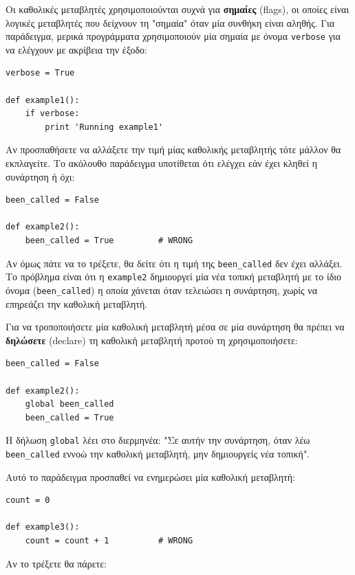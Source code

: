 \documentclass[10pt]{book}
\begin{document}
Οι καθολικές μεταβλητές χρησιμοποιούνται συχνά για {\bf σημαίες} (flags), οι οποίες είναι λογικές μεταβλητές που δείχνουν τη "σημαία" όταν μία συνθήκη είναι αληθής. Για παράδειγμα, μερικά προγράμματα χρησιμοποιούν μία σημαία με όνομα  {\tt verbose} για να ελέγχουν με ακρίβεια την έξοδο:

\begin{verbatim}
verbose = True

def example1():
    if verbose:
        print 'Running example1'
\end{verbatim}
%
Αν προσπαθήσετε να αλλάξετε την τιμή μίας καθολικής μεταβλητής τότε μάλλον θα εκπλαγείτε. Το ακόλουθο παράδειγμα υποτίθεται ότι ελέγχει εάν έχει κληθεί η συνάρτηση ή όχι:

\begin{verbatim}
been_called = False

def example2():
    been_called = True         # WRONG
\end{verbatim}
%
Αν όμως πάτε να το τρέξετε, θα δείτε ότι η τιμή της \verb"been_called" δεν έχει αλλάξει. Το πρόβλημα είναι ότι η {\tt example2} δημιουργεί μία νέα τοπική μεταβλητή με το ίδιο όνομα (\verb"been_called") η οποία χάνεται όταν τελειώσει η συνάρτηση, χωρίς να επηρεάζει την καθολική μεταβλητή.

Για να τροποποιήσετε μία καθολική μεταβλητή μέσα σε μία συνάρτηση θα πρέπει να {\bf δηλώσετε} (declare) τη καθολική μεταβλητή προτού τη χρησιμοποιήσετε:

\begin{verbatim}
been_called = False

def example2():
    global been_called
    been_called = True
\end{verbatim}
%
Η δήλωση {\tt global} λέει στο διερμηνέα: "Σε αυτήν την συνάρτηση, όταν λέω  \verb"been_called" εννοώ την καθολική μεταβλητή, μην δημιουργείς νέα τοπική".

Αυτό το παράδειγμα προσπαθεί να ενημερώσει μία καθολική μεταβλητή:

\begin{verbatim}
count = 0

def example3():
    count = count + 1          # WRONG
\end{verbatim}
%
Αν το τρέξετε θα πάρετε:
\end{document}
